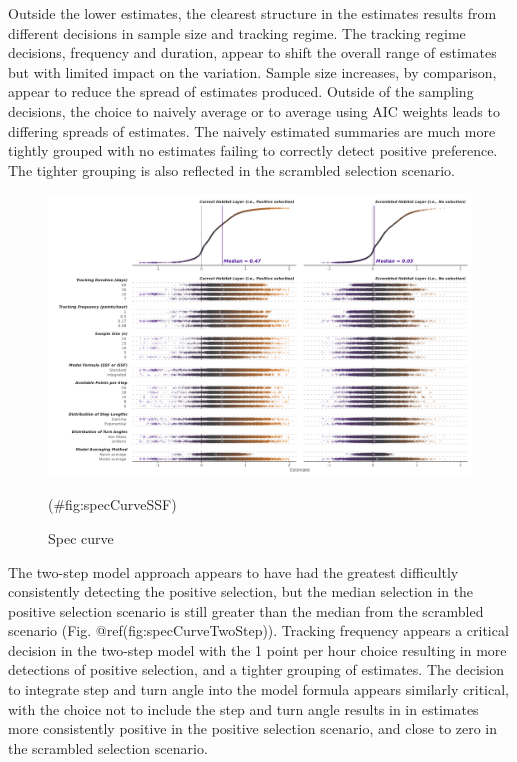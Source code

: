 \documentclass[10pt,a4paper]{article}
\begin{document}
Outside the lower estimates, the clearest structure in the estimates results from different decisions in sample size and tracking regime.
The tracking regime decisions, frequency and duration, appear to shift the overall range of estimates but with limited impact on the variation.
Sample size increases, by comparison, appear to reduce the spread of estimates produced.
Outside of the sampling decisions, the choice to naively average or to average using AIC weights leads to differing spreads of estimates.
The naively estimated summaries are much more tightly grouped with no estimates failing to correctly detect positive preference.
The tighter grouping is also reflected in the scrambled selection scenario.

\begin{figure}
\includegraphics[width=1\linewidth]{../figures/ssf_specCurve} \caption{Spec curve}(\#fig:specCurveSSF)
\end{figure}

The two-step model approach appears to have had the greatest difficultly consistently detecting the positive selection, but the median selection in the positive selection scenario is still greater than the median from the scrambled scenario (Fig. @ref(fig:specCurveTwoStep)).
Tracking frequency appears a critical decision in the two-step model with the 1 point per hour choice resulting in more detections of positive selection, and a tighter grouping of estimates.
The decision to integrate step and turn angle into the model formula appears similarly critical, with the choice not to include the step and turn angle results in in estimates more consistently positive in the positive selection scenario, and close to zero in the scrambled selection scenario.
\end{document}
